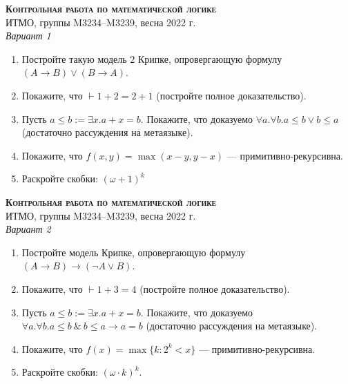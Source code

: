 \documentclass[11pt,a4paper,oneside]{scrartcl}
\begin{document}
\pagestyle{empty}

\begin{center}
{\large\scshape\bfseries Контрольная работа по математической логике}\\
ИТМО, группы M3234--M3239, весна 2022 г.\\
\itshape Вариант 1
\end{center}


\begin{enumerate}
\item Постройте такую модель 2 Крипке, опровергающую формулу $(A \rightarrow B) \vee (B \rightarrow A)$.
\item Покажите, что $\vdash 1+2 = 2+ 1$ (постройте полное доказательство).
\item Пусть $a \le b := \exists x.a + x = b$. Покажите, что доказуемо $\forall a.\forall b.a \le b \vee b \le a$
(достаточно рассуждения на метаязыке).
\item Покажите, что $f(x,y) = \max(x-y,y-x)$ --- примитивно-рекурсивна.
\item Раскройте скобки: $(\omega + 1)^k$
\end{enumerate}

\vspace{3cm}
\begin{center}
{\large\scshape\bfseries Контрольная работа по математической логике}\\
ИТМО, группы M3234--M3239, весна 2022 г.\\
\itshape Вариант 2
\end{center}

\begin{enumerate}
\item Постройте модель Крипке, опровергающую формулу $(A \rightarrow B) \rightarrow (\neg A \vee B)$.
\item Покажите, что $\vdash 1 + 3 = 4$ (постройте полное доказательство).
\item Пусть $a \le b := \exists x.a + x = b$. Покажите, что доказуемо $\forall a.\forall b.a \le b \ \&\ b \le a \rightarrow a = b$
(достаточно рассуждения на метаязыке).
\item Покажите, что $f(x) = \max \{ k: 2^k < x \}$ --- примитивно-рекурсивна.
\item Раскройте скобки: $(\omega\cdot k)^k$.
\end{enumerate}
\end{document}
